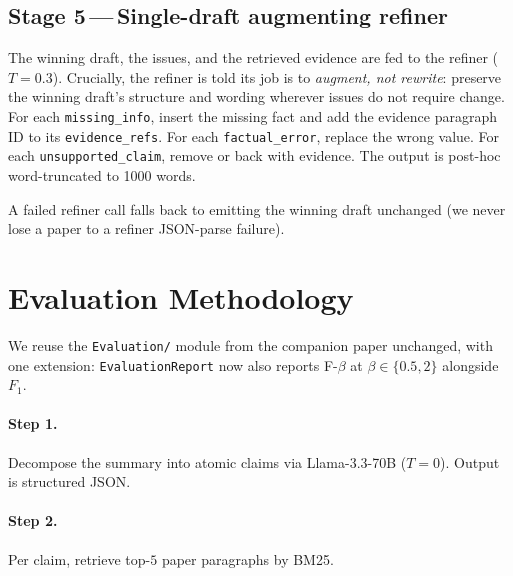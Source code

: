 \documentclass[11pt,a4paper]{article}
\begin{document}
\subsection*{Stage 5\,---\,Single-draft augmenting refiner}
The winning draft, the issues, and the retrieved evidence are fed to
the refiner ($T\!=\!0.3$). Crucially, the refiner is told its job is
to \emph{augment, not rewrite}: preserve the winning draft's
structure and wording wherever issues do not require change. For
each \texttt{missing\_info}, insert the missing fact and add the
evidence paragraph ID to its \texttt{evidence\_refs}. For each
\texttt{factual\_error}, replace the wrong value. For each
\texttt{unsupported\_claim}, remove or back with evidence. The
output is post-hoc word-truncated to 1000 words.

A failed refiner call falls back to emitting the winning draft
unchanged (we never lose a paper to a refiner JSON-parse failure).

\section{Evaluation Methodology}
\label{sec:eval}

We reuse the \texttt{Evaluation/} module from the companion paper
unchanged, with one extension: \texttt{EvaluationReport} now also
reports F-$\beta$ at $\beta\in\{0.5,2\}$ alongside $F_1$.

\paragraph{Step 1.}
Decompose the summary into atomic claims via Llama-3.3-70B
($T\!=\!0$). Output is structured JSON.

\paragraph{Step 2.}
Per claim, retrieve top-$5$ paper paragraphs by BM25.
\end{document}
